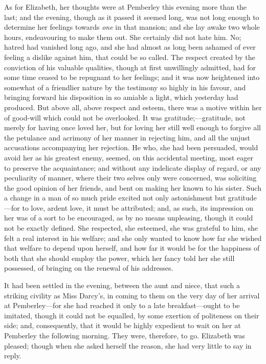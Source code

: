\documentclass[12pt]{book}
\begin{document}
As for Elizabeth, her thoughts were at Pemberley this evening more than the last; and the evening, though as it passed it seemed long, was not long enough to determine her feelings towards \textit{one} in that mansion; and she lay awake two whole hours, endeavouring to make them out. She certainly did not hate him. No; hatred had vanished long ago, and she had almost as long been ashamed of ever feeling a dislike against him, that could be so called. The respect created by the conviction of his valuable qualities, though at first unwillingly admitted, had for some time ceased to be repugnant to her feelings; and it was now heightened into somewhat of a friendlier nature by the testimony so highly in his favour, and bringing forward his disposition in so amiable a light, which yesterday had produced. But above all, above respect and esteem, there was a motive within her of good-will which could not be overlooked. It was gratitude;---gratitude, not merely for having once loved her, but for loving her still well enough to forgive all the petulance and acrimony of her manner in rejecting him, and all the unjust accusations accompanying her rejection. He who, she had been persuaded, would avoid her as his greatest enemy, seemed, on this accidental meeting, most eager to preserve the acquaintance; and without any indelicate display of regard, or any peculiarity of manner, where their two selves only were concerned, was soliciting the good opinion of her friends, and bent on making her known to his sister. Such a change in a man of so much pride excited not only astonishment but gratitude---for to love, ardent love, it must be attributed; and, as such, its impression on her was of a sort to be encouraged, as by no means unpleasing, though it could not be exactly defined. She respected, she esteemed, she was grateful to him, she felt a real interest in his welfare; and she only wanted to know how far she wished that welfare to depend upon herself, and how far it would be for the happiness of both that she should employ the power, which her fancy told her she still possessed, of bringing on the renewal of his addresses.

It had been settled in the evening, between the aunt and niece, that such a striking civility as Miss Darcy's, in coming to them on the very day of her arrival at Pemberley---for she had reached it only to a late breakfast---ought to be imitated, though it could not be equalled, by some exertion of politeness on their side; and, consequently, that it would be highly expedient to wait on her at Pemberley the following morning. They were, therefore, to go. Elizabeth was pleased; though when she asked herself the reason, she had very little to say in reply.
\end{document}
